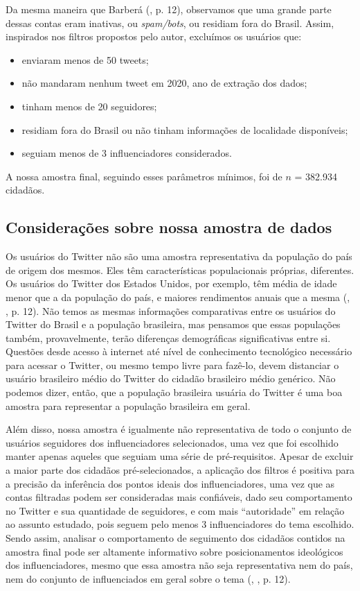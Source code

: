 \documentclass[
	12pt,				%
	openright,			%
	twoside,			%
	a4paper,			%
	english,			%
	brazil				%
	]{abntex2}
\begin{document}
 Da mesma maneira que Barberá (\citeyear{barbera2015}, p. 12), observamos que uma grande parte dessas contas eram inativas, ou \textit{spam/bots}, ou residiam fora do Brasil. Assim, inspirados nos filtros propostos pelo autor, excluímos os usuários que:
 \begin{itemize}
 \item enviaram menos de 50 tweets;
 \item não mandaram nenhum tweet em 2020, ano de extração dos dados;
 \item tinham menos de 20 seguidores;
 \item residiam fora do Brasil ou não tinham informações de localidade disponíveis;
 \item seguiam menos de 3 influenciadores considerados. 
 \end{itemize}
 A nossa amostra final, seguindo esses parâmetros mínimos, foi de $n$ = 382.934 cidadãos.

 \subsection{Considerações sobre nossa amostra de dados}
 Os usuários do Twitter não são uma amostra representativa da população do país de origem dos mesmos. Eles têm características populacionais próprias, diferentes. Os usuários do Twitter dos Estados Unidos, por exemplo, têm média de idade menor que a da população do país, e maiores rendimentos anuais que a mesma (, \citeyear{barbera2015}, p. 12). Não temos as mesmas informações comparativas entre os usuários do Twitter do Brasil e a população brasileira, mas pensamos que essas populações também, provavelmente, terão diferenças demográficas significativas entre si. Questões desde acesso à internet até nível de conhecimento tecnológico necessário para acessar o Twitter, ou mesmo tempo livre para fazê-lo, devem distanciar o usuário brasileiro médio do Twitter do cidadão brasileiro médio genérico. Não podemos dizer, então, que a população brasileira usuária do Twitter é uma boa amostra para representar a população brasileira em geral.

 Além disso, nossa amostra é igualmente não representativa de todo o conjunto de usuários seguidores dos influenciadores selecionados, uma vez que foi escolhido manter apenas aqueles que seguiam uma série de pré-requisitos. Apesar de excluir a maior parte dos cidadãos pré-selecionados, a aplicação dos filtros é positiva para a precisão da inferência dos pontos ideais dos influenciadores, uma vez que as contas filtradas podem ser consideradas mais confiáveis, dado seu comportamento no Twitter e sua quantidade de seguidores, e com mais ``autoridade'' em relação ao assunto estudado, pois seguem pelo menos 3 influenciadores do tema escolhido. Sendo assim, analisar o comportamento de seguimento dos cidadãos contidos na amostra final pode ser altamente informativo sobre posicionamentos ideológicos dos influenciadores, mesmo que essa amostra não seja representativa nem do país, nem do conjunto de influenciados em geral sobre o tema (, \citeyear{barbera2015}, p. 12).
\end{document}
